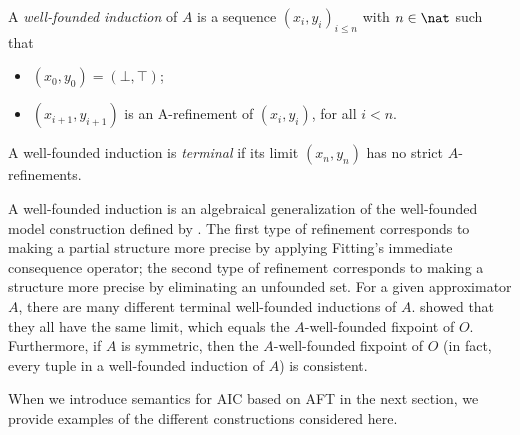  \begin{definition}
 A \emph{well-founded induction} of $A$  is a sequence 
$(x_i,y_i)_{i\leq n}$
with $n\in\nat$ such that 
\begin{itemize}
	\item $(x_0,y_0) = (\bot,\top)$;
	\item $(x_{i+1},y_{i+1})$ is an A-refinement of $(x_{i},y_{i})$, for  all $i<n$.
\end{itemize}
A well-founded induction is \emph{terminal} if its limit $(x_n,y_n)$ has no strict $A$-refinements.
\end{definition}
A well-founded induction is an algebraical generalization of the well-founded model construction defined by \citet{GelderRS91}. 
The first type of refinement corresponds to making a partial structure more precise by applying Fitting's immediate consequence operator; the second type of refinement corresponds to making a structure more precise by eliminating an unfounded set. 
For a given approximator $A$, there are many different terminal well-founded inductions of $A$.
\citet{lpnmr/DeneckerV07}  showed that they all have the same limit, which equals the $A$-well-founded fixpoint of $O$. Furthermore, if $A$ is symmetric, then the $A$-well-founded fixpoint of $O$ (in fact, every tuple in a well-founded induction of $A$) is consistent.


When we introduce semantics for AIC based on AFT in the next section, we provide examples of the different constructions considered here. 


